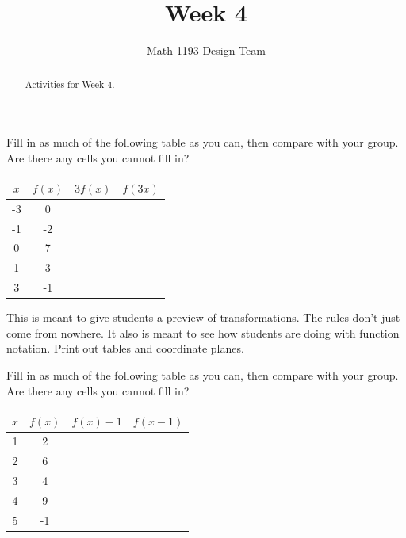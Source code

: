 \documentclass[noauthor]{ximera}
\title{Week 4}
\author{Math 1193 Design Team}
\begin{document}
\begin{abstract}
    Activities for Week 4.
\end{abstract}
\maketitle

\begin{problem}
Fill in as much of the following table as you can, then 
compare with your group. Are there any cells you cannot fill in?

\begin{center}
\begin{tabular}{|c|c|c|c|} 
 \hline
 \(x\) & \(f(x)\) & \(3f(x)\) & \(f(3x)\) \\
 \hline\hline
 -3 & 0 &  &  \\ 
 \hline
 -1 & -2 &  &  \\
 \hline
 0 & 7 &  &  \\
 \hline
 1 & 3 &  &  \\
 \hline
 3 & -1 &  &  \\
 \hline
\end{tabular}
\end{center}

\begin{instructorNotes}
This is meant to give students a preview of transformations. The rules don't
just come from nowhere. It also is meant to see how students are doing
with function notation. Print out tables and coordinate planes.
\end{instructorNotes}
\end{problem}

\begin{problem}
Fill in as much of the following table as you can, then 
compare with your group. Are there any cells you cannot fill in?

\begin{center}
\begin{tabular}{|c|c|c|c|} 
 \hline
 \(x\) & \(f(x)\) & \(f(x)-1\) & \(f(x - 1)\) \\
 \hline\hline
 1 & 2 &  &  \\ 
 \hline
 2 & 6 &  &  \\
 \hline
 3 & 4 &  &  \\
 \hline
 4 & 9 &  &  \\
 \hline
 5 & -1 &  &  \\
 \hline
\end{tabular}
\end{center}
\end{problem}
\end{document}
